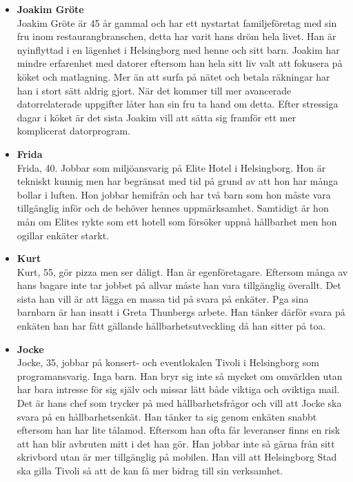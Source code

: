 \documentclass[12pt]{article}
\begin{document}
\begin{itemize}
        \begin{itemize}
            \item [] \textbf{Joakim Gröte}
            \\
            Joakim Gröte är 45 år gammal och har ett nystartat familjeföretag med sin fru inom restaurangbranschen, detta har varit hans dröm hela livet. Han är  nyinflyttad i en lägenhet i Helsingborg med henne och sitt barn. Joakim har mindre erfarenhet med datorer eftersom han hela sitt liv valt att fokusera på köket och matlagning. Mer än att surfa på nätet och betala räkningar har han i stort sätt aldrig gjort. När det kommer till mer avancerade datorrelaterade uppgifter låter han sin fru ta hand om detta. Efter stressiga dagar i köket är det sista Joakim vill att sätta sig framför ett mer komplicerat datorprogram. 
            
             \item [] \textbf{Frida}
            \\
            Frida, 40. Jobbar som miljöansvarig på Elite Hotel i Helsingborg. Hon är tekniskt kunnig men har begränsat med tid på grund av att hon har många bollar i luften. Hon jobbar hemifrån och har två barn som hon måste vara tillgänglig inför och de behöver hennes uppmärksamhet. Samtidigt är hon mån om Elites rykte som ett hotell som försöker uppnå hållbarhet men hon ogillar enkäter starkt.
            
             \item [] \textbf{Kurt}
            \\
            Kurt, 55, gör pizza men ser dåligt. Han är egenföretagare. Eftersom många av hans bagare inte tar jobbet på allvar måste han vara tillgänglig överallt. Det sista han vill är att lägga en massa tid på svara på enkäter. Pga sina barnbarn är han insatt i Greta Thunbergs arbete. Han tänker därför svara på enkäten han har fått gällande hållbarhetsutveckling då han sitter på toa.
            
            \item [] \textbf{Jocke}
            \\
            Jocke, 35, jobbar på konsert- och eventlokalen Tivoli i Helsingborg som programansvarig. Inga barn. Han bryr sig inte så mycket om omvärlden utan har bara intresse för sig själv och missar lätt både viktiga och oviktiga mail. Det är hans chef som trycker på med hållbarhetsfrågor och vill att Jocke ska svara på en hållbarhetsenkät. Han tänker ta sig genom enkäten snabbt eftersom han har lite tålamod. Eftersom han ofta får leveranser finns en risk att han blir avbruten mitt i det han gör. Han jobbar inte så gärna från sitt skrivbord utan är mer tillgänglig på mobilen. Han vill att Helsingborg Stad ska gilla Tivoli så att de kan få mer bidrag till sin verksamhet. 
            

\end{itemize}
\end{itemize}
\end{document}
